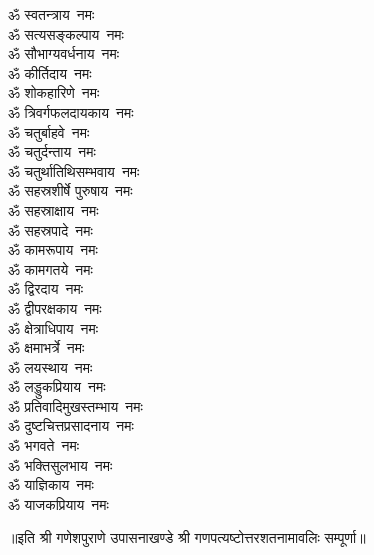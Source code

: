\begin{multicols}{2}
\begin{flushleft}
ॐ स्वतन्त्राय~नमः\\
ॐ सत्यसङ्कल्पाय~नमः\\
ॐ सौभाग्यवर्धनाय~नमः\\
ॐ कीर्तिदाय~नमः\\
ॐ शोकहारिणे~नमः\\
ॐ त्रिवर्गफलदायकाय~नमः\\
ॐ चतुर्बाहवे~नमः\\
ॐ चतुर्दन्ताय~नमः\hfill{}\\
ॐ चतुर्थातिथिसम्भवाय~नमः\\
ॐ सहस्रशीर्षे पुरुषाय~नमः\\
ॐ सहस्राक्षाय~नमः\\
ॐ सहस्रपादे~नमः\\
ॐ कामरूपाय~नमः\\
ॐ कामगतये~नमः\\
ॐ द्विरदाय~नमः\\
ॐ द्वीपरक्षकाय~नमः\\
ॐ क्षेत्राधिपाय~नमः\\
ॐ क्षमाभर्त्रे~नमः\hfill{}\\
ॐ लयस्थाय~नमः\\
ॐ लड्डुकप्रियाय~नमः\\
ॐ प्रतिवादिमुखस्तम्भाय~नमः\\
ॐ दुष्टचित्तप्रसादनाय~नमः\\
ॐ भगवते~नमः\\
ॐ भक्तिसुलभाय~नमः\\
ॐ याज्ञिकाय~नमः\\
ॐ याजकप्रियाय~नमः\\
\end{flushleft}
\end{multicols}
॥इति श्री गणेशपुराणे उपासनाखण्डे श्री गणपत्यष्टोत्तरशतनामावलिः सम्पूर्णा॥
